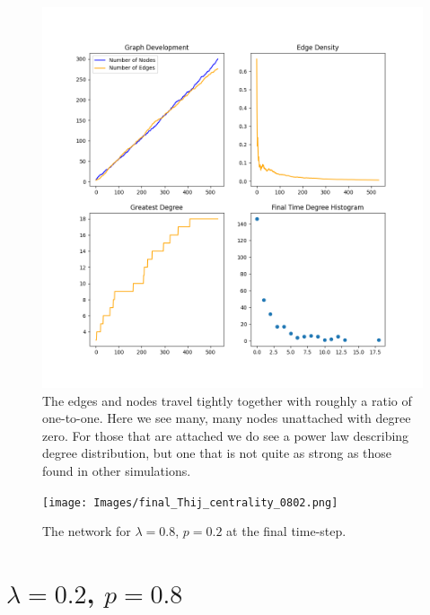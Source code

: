 \begin{figure}[h!]
    \includegraphics[width=14cm]{Images/twitter_sim_stats_3_0.8_0.2.png}
    \centering
    \caption{The edges and nodes travel tightly together with roughly a ratio of 
     one-to-one. Here we see many, many nodes unattached with degree zero.
    For those that are attached we do see a power law describing degree distribution, but one that is not quite
    as strong as those found in other simulations.}
    \label{fig:stats0802}
\end{figure}


\begin{figure}[h!]
    \texttt{[image: Images/final\_Thij\_centrality\_0802.png]}
    \centering
    \caption{The network for $\lambda=0.8$, $p=0.2$ at the final time-step.}
    \label{fig:network0802}
\end{figure}

\clearpage

\section{$\lambda=0.2$, $p=0.8$}

